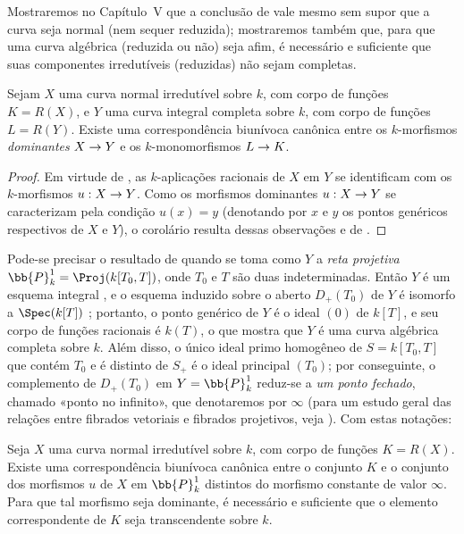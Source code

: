 \documentclass[oneside,10pt]{amsart}
\makeatletter
\newcommand{\ega@arrow}[2]{\mathchoice{#1}{#2}{#2}{#2}}
\renewcommand{\to}{\ega@arrow{\longrightarrow}{\rightarrow}}
\newcommand{\oldpage}[2][]{\marginnote{\normalfont\footnotesize\textbf{#1}~|~#2}\ignorespaces}
\let\EGAOriginalLabel\label
\renewcommand{\label}[1]{\phantomsection\EGAOriginalLabel{#1}}
\makeatother
\begin{document}
\oldpage[II]{151}
\begin{remark}[7.4.12]
\label{II.7.4.12}
Mostraremos no Capítulo~V que a conclusão de  vale mesmo sem supor que a curva seja normal (nem sequer reduzida);
mostraremos também que, para que uma curva algébrica (reduzida ou não) seja afim, é necessário e suficiente que suas componentes irredutíveis (reduzidas) não sejam completas.
\end{remark}

\begin{corollary}[7.4.13]
\label{II.7.4.13}
Sejam $X$ uma curva normal irredutível sobre $k$, com corpo de funções $K=R(X)$, e $Y$ uma curva integral completa sobre $k$, com corpo de funções $L=R(Y)$.
Existe uma correspondência biunívoca canônica entre os $k$-morfismos \emph{dominantes} $X\to Y$ e os $k$-monomorfismos $L\to K$.
\end{corollary}

\begin{proof}
Em virtude de , as $k$-aplicações racionais de $X$ em $Y$ se identificam com os $k$-morfismos $u:X\to Y$.
Como os morfismos dominantes $u:X\to Y$ se caracterizam pela condição $u(x)=y$ (denotando por $x$ e $y$ os pontos genéricos respectivos de $X$ e $Y$), o corolário resulta dessas observações e de .
\end{proof}

\begin{env}[7.4.14]
\label{II.7.4.14}
Pode-se precisar o resultado de  quando se toma como $Y$ a \emph{reta projetiva} $\bb{P}_k^1=\Proj(k[T_0,T])$, onde $T_0$ e $T$ são duas indeterminadas.
Então $Y$ é um esquema integral , e o esquema induzido sobre o aberto $D_+(T_0)$ de $Y$ é isomorfo a $\Spec(k[T])$ ; portanto, o ponto genérico de $Y$ é o ideal $(0)$ de $k[T]$, e seu corpo de funções racionais é $k(T)$, o que mostra que $Y$ é uma curva algébrica completa sobre $k$.
Além disso, o único ideal primo homogêneo de $S=k[T_0,T]$ que contém $T_0$ e é distinto de $S_+$ é o ideal principal $(T_0)$; por conseguinte, o complemento de $D_+(T_0)$ em $Y=\bb{P}_k^1$ reduz-se a \emph{um ponto fechado}, chamado «ponto no infinito», que denotaremos por $\infty$ (para um estudo geral das relações entre fibrados vetoriais e fibrados projetivos, veja ).
Com estas notações:
\end{env}

\begin{corollary}[7.4.15]
\label{II.7.4.15}
Seja $X$ uma curva normal irredutível sobre $k$, com corpo de funções $K=R(X)$.
Existe uma correspondência biunívoca canônica entre o conjunto $K$ e o conjunto dos morfismos $u$ de $X$ em $\bb{P}_k^1$ distintos do morfismo constante de valor $\infty$.
Para que tal morfismo seja dominante, é necessário e suficiente que o elemento correspondente de $K$ seja transcendente sobre $k$.
\end{corollary}
\end{document}
